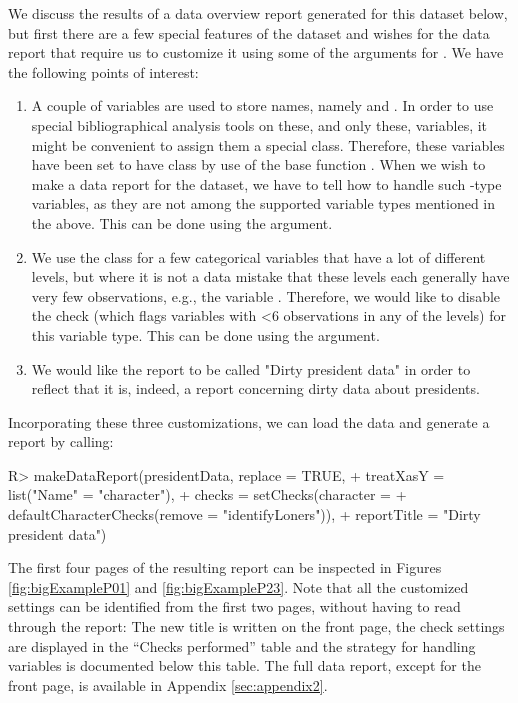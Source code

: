 \documentclass[article,shortnames]{jss}
\begin{document}
We discuss the results of a data overview report generated for this dataset below, but first there are a few special features of the dataset and wishes for the data report that require us to customize it using some of the arguments for . We have the following points of interest:
\begin{enumerate}
\item A couple of variables are used to store names, namely  and . In order to use special bibliographical analysis tools on these, and only these, variables, it might be convenient to assign them a special class. Therefore, these variables have been set to have class  by use of the base  function . When we wish to make a data report for the dataset, we have to tell  how to handle such -type variables, as they are not among the supported variable types mentioned in the above. This can be done using the  argument.
\item We use the  class for a few categorical variables that have a lot of different levels, but where it is not a data mistake that these levels each generally have very few observations, e.g., the variable . Therefore, we would like to disable the  check (which flags variables with <6 observations in any of the levels) for this variable type. This can be done using the  argument.
\item We would like the report to be called "Dirty president data" in order to reflect that it is, indeed, a report concerning dirty data about presidents.
\end{enumerate}
Incorporating these three customizations, we can load the data and generate a report by calling:

\begin{Schunk}
\begin{Sinput}
R> makeDataReport(presidentData, replace = TRUE, 
+    treatXasY = list("Name" = "character"),
+    checks = setChecks(character = 
+    defaultCharacterChecks(remove = "identifyLoners")),
+    reportTitle = "Dirty president data")
\end{Sinput}
\end{Schunk}

The first four pages of the resulting report can be inspected in Figures \ref{fig:bigExampleP01} and \ref{fig:bigExampleP23}. Note that all the customized settings can be identified from the first two pages, without having to read through the report: The new title is written on the front page, the check settings are displayed in the ``Checks performed'' table and the strategy for handling  variables is documented below this table. The full data report, except for the front page, is available in Appendix \ref{sec:appendix2}. 
\end{document}
